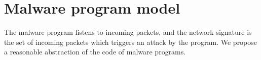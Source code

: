 \documentclass[twocolumn, 11pt]{paper}
\begin{document}
%
%

\section{Malware program model} \label{sec:malwaremodel}
The malware program listens to incoming packets, and the
network signature is the set of incoming packets which triggers
an attack by the program. We propose a reasonable abstraction
of the code of malware programs. 
\end{document}
